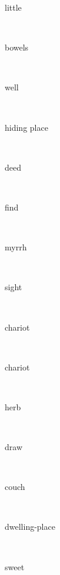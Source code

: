 \documentclass[a4paper]{article}
\begin{document}
\begin{multicols}{4}
\begin{multicols}{4}
\begin{multicols}{5}
{\hebrewfont{}} \begin{english}little\end{english}\\
{\hebrewfont{}} \begin{english}bowels\end{english}\\
{\hebrewfont{}} \begin{english}well\end{english}\\
{\hebrewfont{}} \begin{english}hiding place\end{english}\\
{\hebrewfont{}} \begin{english}deed\end{english}\\
{\hebrewfont{}} \begin{english}find\end{english}\\
{\hebrewfont{}} \begin{english}myrrh\end{english}\\
{\hebrewfont{}} \begin{english}sight\end{english}\\
{\hebrewfont{}} \begin{english}chariot\end{english}\\
{\hebrewfont{}} \begin{english}chariot\end{english}\\
{\hebrewfont{}} \begin{english}herb\end{english}\\
{\hebrewfont{}} \begin{english}draw\end{english}\\
{\hebrewfont{}} \begin{english}couch\end{english}\\
{\hebrewfont{}} \begin{english}dwelling-place\end{english}\\
{\hebrewfont{}} \begin{english}sweet\end{english}\\

\end{multicols}
\end{multicols}
\end{multicols}
\end{document}
